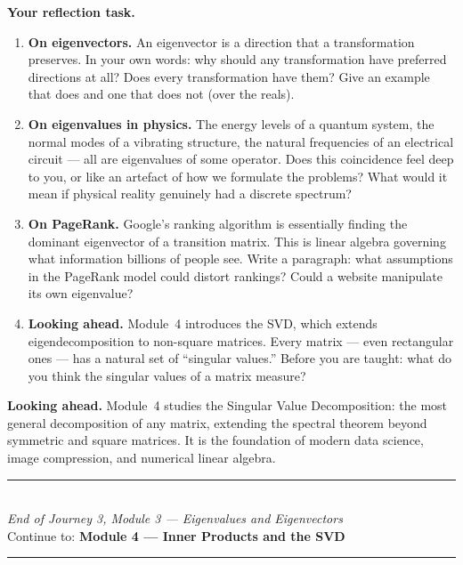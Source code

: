 \documentclass[12pt, a4paper]{article}
\newcounter{problem}
\begin{document}
\begin{reflectionbox}
\textbf{Your reflection task.}

\begin{enumerate}
  \item \textbf{On eigenvectors.} An eigenvector is a direction that a transformation preserves. In your own words: why should any transformation have preferred directions at all? Does every transformation have them? Give an example that does and one that does not (over the reals).

  \item \textbf{On eigenvalues in physics.} The energy levels of a quantum system, the normal modes of a vibrating structure, the natural frequencies of an electrical circuit --- all are eigenvalues of some operator. Does this coincidence feel deep to you, or like an artefact of how we formulate the problems? What would it mean if physical reality genuinely had a discrete spectrum?

  \item \textbf{On PageRank.} Google's ranking algorithm is essentially finding the dominant eigenvector of a transition matrix. This is linear algebra governing what information billions of people see. Write a paragraph: what assumptions in the PageRank model could distort rankings? Could a website manipulate its own eigenvalue?

  \item \textbf{Looking ahead.} Module~4 introduces the SVD, which extends eigendecomposition to non-square matrices. Every matrix --- even rectangular ones --- has a natural set of ``singular values.'' Before you are taught: what do you think the singular values of a matrix measure?
\end{enumerate}
\end{reflectionbox}

\medskip
\noindent\textbf{Looking ahead.}
Module~4 studies the Singular Value Decomposition: the most general decomposition of any matrix, extending the spectral theorem beyond symmetric and square matrices. It is the foundation of modern data science, image compression, and numerical linear algebra.

\vspace{1.4cm}
\begin{center}
{\color{MidBlue}\rule{0.5\linewidth}{0.8pt}}\\[6pt]
{\small\color{DarkGrey}\textit{End of Journey 3, Module 3 --- Eigenvalues and Eigenvectors}}\\[4pt]
{\small\color{DarkGrey}Continue to: \textbf{Module 4 --- Inner Products and the SVD}}\\[6pt]
{\color{MidBlue}\rule{0.5\linewidth}{0.8pt}}
\end{center}
\end{document}
